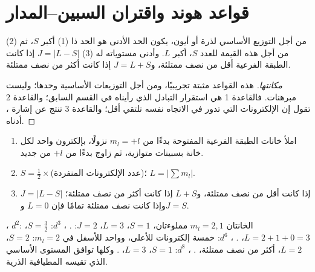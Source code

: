 \section{قواعد هوند واقتران السبين--المدار}

\begin{proposition}\label{prop:b3:many-electron-atoms:hund-terms}
من أجل التوزيع الأساسي لذرة أو أيون، يكون الحد الأدنى هو الحد
ذا (1) أكبر $S$، ثم (2) من أجل هذه القيمة للعدد $S$، أكبر $L$. وأدنى
مستوياته له (3) $J = |L - S|$ إذا كانت الطبقة الفرعية أقل من نصف ممتلئة، و$J = L +
S$ إذا كانت أكثر من نصف ممتلئة.
\end{proposition}
\begin{proof}[مكانتها]
هذه القواعد مثبتة تجريبيًا، ومن أجل التوزيعات الأساسية وحدها؛
وليست مبرهنات. فالقاعدة 1 هي استقرار التبادل الذي رأيناه في القسم
السابق؛ والقاعدة 2 تقول إن الإلكترونات التي تدور في الاتجاه نفسه تلتقي
أقل؛ والقاعدة 3 تنتج عن إشارة ، أدناه.
\end{proof}

\begin{method}\label{met:b3:many-electron-atoms:ground-term}
\begin{enumerate}
  \item املأ خانات الطبقة الفرعية المفتوحة بدءًا من $m_l = +l$ نزولًا، بإلكترون
        واحد لكل خانة بسبينات متوازية، ثم زاوج بدءًا من $+l$ من جديد.
  \item $S = \frac12 \times$(عدد الإلكترونات المنفردة)؛ $L = |\sum m_l|$.
  \item $J = |L - S|$ إذا كانت أقل من نصف ممتلئة، و$L + S$ إذا كانت أكثر من نصف
        ممتلئة؛ وإذا كانت نصف ممتلئة تمامًا فإن $L = 0$ و$J = S$.
\end{enumerate}
\end{method}

\begin{example}\label{ex:b3:many-electron-atoms:ground-terms}
، $d^2$: الخانتان $m_l = 2, 1$ مملوءتان، $S = 1$، $L = 3$، $J = 2$:
. ، $d^3$: $S = \frac32$، $L = 2 + 1 + 0 = 3$،
. ، $d^6$: خمسة إلكترونات للأعلى، وواحد للأسفل في $m_l = 2$:
$S = 2$، $L = 2$، أكثر من نصف ممتلئة، . ، $d^8$:
$S = 1$، $L = 3$، . وكلها توافق المستوى الأساسي الذي
تقيسه المطيافية الذرية.
\end{example}

